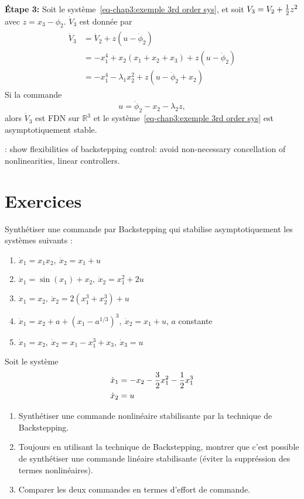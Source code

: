 \begin{example}
   \textbf{Étape 3:} Soit le système~\eqref{eq-chap3:exemple 3rd order sys}, et soit $V_3=V_2 + \frac{1}{2} z^2$ avec $z = x_3-\phi_2$. $\dot{V}_3$ est donnée par 
   \begin{align}
	   	\begin{split}
	   		\dot{V}_3 &= \dot{V}_2 + z\left(u-\dot{\phi}_2\right)\\
	   		&= -x_1^4 + x_2\left(x_1 +x_2 + x_3\right)+ z\left(u-\dot{\phi}_2\right) \\ 
	   		&= -x_1^4 -\lambda_1x_2^2 + z\left(u-\dot{\phi}_2+x_2\right)  
	   	\end{split}
   \end{align}
   Si la commande 
   \begin{equation}
   	u = \dot{\phi}_2-x_2-\lambda_2z,
   \end{equation} 
   alors $\dot{V}_3$ est FDN sur $\mathbb{R}^3$ et le système~\eqref{eq-chap3:exemple 3rd order sys} est asymptotiquement stable.
\end{example}
\cite{krstic1995bookNnlinearAdaptiveControl} : show flexibilities of backstepping control: avoid non-necessary concellation of nonlinearities, linear controllers.  
\newpage
\section{Exercices}
\begin{exercise}
	Synthétiser une commande par Backstepping qui stabilise asymptotiquement les systèmes suivants : 
	\begin{enumerate}
		\item $\dot{x}_1 = x_1x_2, \ \dot{x}_2 = x_1 +u$
		\item $\dot{x}_1 = \sin(x_1)+x_2, \ \dot{x}_2 = x_1^2 +2u$
		\item $\dot{x}_1 = x_2, \ \dot{x}_2 = 2(x_1^3+x_2^3) +u$
		\item $\dot{x}_1 = x_2 + a + (x_1-a^{1/3})^3, \ \dot{x}_2 = x_1 +u$, $a$ constante
		\item $\dot{x}_1 = x_2, \ \dot{x}_2 = x_1 - x_1^3 +x_3, \ \dot{x}_3=u$
	\end{enumerate}
\end{exercise}
\begin{exercise}
	Soit le système 
	\begin{align}
	\begin{split}
		\dot{x}_1 &= -x_2-\frac{3}{2}x_1^2-\frac{1}{2} x_1^3\\
		\dot{x}_2 &=u
	\end{split}
	\end{align}
	\begin{enumerate}
		\item Synthétiser une commande nonlinéaire stabilisante par la technique de Backstepping.
		\item Toujours en utilisant la technique de Backstepping, montrer que c'est possible de synthétiser une commande linéaire stabilisante (éviter la suppréssion des termes nonlinéaires).
		\item Comparer les deux commandes en termes d'effort de commande.
	\end{enumerate}
\end{exercise}

